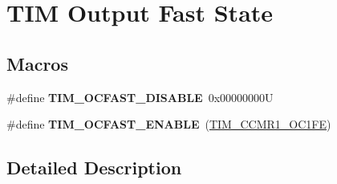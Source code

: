 \hypertarget{group___t_i_m___output___fast___state}{}\section{T\+IM Output Fast State}
\label{group___t_i_m___output___fast___state}
\subsection*{Macros}
\begin{DoxyCompactItemize}
\item 
\mbox{\label{group___t_i_m___output___fast___state_ga71429b63f2a6604171ccfd3a91ccf43a}} 
\#define {\bfseries T\+I\+M\+\_\+\+O\+C\+F\+A\+S\+T\+\_\+\+D\+I\+S\+A\+B\+LE}~0x00000000U
\item 
\mbox{\label{group___t_i_m___output___fast___state_ga445a2c0633ac649e816cf7a16b716d61}} 
\#define {\bfseries T\+I\+M\+\_\+\+O\+C\+F\+A\+S\+T\+\_\+\+E\+N\+A\+B\+LE}~(\mbox{\hyperlink{group___peripheral___registers___bits___definition_gab9c5878e85ce02c22d8a374deebd1b6e}{T\+I\+M\+\_\+\+C\+C\+M\+R1\+\_\+\+O\+C1\+FE}})
\end{DoxyCompactItemize}


\subsection{Detailed Description}
